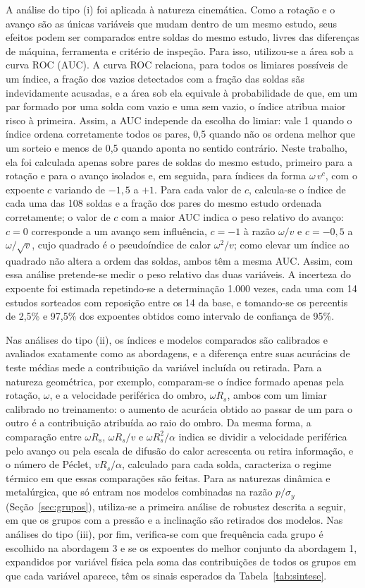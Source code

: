 \documentclass[12pt,openany]{report}
\begin{document}
A análise do tipo (i) foi aplicada à natureza cinemática. Como a rotação e o avanço são as únicas variáveis que mudam dentro de um mesmo estudo, seus efeitos podem ser comparados entre soldas do mesmo estudo, livres das diferenças de máquina, ferramenta e critério de inspeção. Para isso, utilizou-se a área sob a curva ROC (AUC). A curva ROC relaciona, para todos os limiares possíveis de um índice, a fração dos vazios detectados com a fração das soldas sãs indevidamente acusadas, e a área sob ela equivale à probabilidade de que, em um par formado por uma solda com vazio e uma sem vazio, o índice atribua maior risco à primeira. Assim, a AUC independe da escolha do limiar: vale 1 quando o índice ordena corretamente todos os pares, 0,5 quando não os ordena melhor que um sorteio e menos de 0,5 quando aponta no sentido contrário. Neste trabalho, ela foi calculada apenas sobre pares de soldas do mesmo estudo, primeiro para a rotação e para o avanço isolados e, em seguida, para índices da forma $\omega\,v^{c}$, com o expoente $c$ variando de $-1{,}5$ a $+1$. Para cada valor de $c$, calcula-se o índice de cada uma das 108 soldas e a fração dos pares do mesmo estudo ordenada corretamente; o valor de $c$ com a maior AUC indica o peso relativo do avanço: $c = 0$ corresponde a um avanço sem influência, $c = -1$ à razão $\omega/v$ e $c = -0{,}5$ a $\omega/\sqrt{v}$, cujo quadrado é o pseudoíndice de calor $\omega^{2}/v$; como elevar um índice ao quadrado não altera a ordem das soldas, ambos têm a mesma AUC. Assim, com essa análise pretende-se medir o peso relativo das duas variáveis. A incerteza do expoente foi estimada repetindo-se a determinação 1.000 vezes, cada uma com 14 estudos sorteados com reposição entre os 14 da base, e tomando-se os percentis de 2,5\% e 97,5\% dos expoentes obtidos como intervalo de confiança de 95\%.

Nas análises do tipo (ii), os índices e modelos comparados são calibrados e avaliados exatamente como as abordagens, e a diferença entre suas acurácias de teste médias mede a contribuição da variável incluída ou retirada. Para a natureza geométrica, por exemplo, comparam-se o índice formado apenas pela rotação, $\omega$, e a velocidade periférica do ombro, $\omega R_s$, ambos com um limiar calibrado no treinamento: o aumento de acurácia obtido ao passar de um para o outro é a contribuição atribuída ao raio do ombro. Da mesma forma, a comparação entre $\omega R_s$, $\omega R_s/v$ e $\omega R_{s}^{2}/\alpha$ indica se dividir a velocidade periférica pelo avanço ou pela escala de difusão do calor acrescenta ou retira informação, e o número de Péclet, $vR_s/\alpha$, calculado para cada solda, caracteriza o regime térmico em que essas comparações são feitas. Para as naturezas dinâmica e metalúrgica, que só entram nos modelos combinadas na razão $p/\sigma_y$ (Seção~\ref{sec:grupos}), utiliza-se a primeira análise de robustez descrita a seguir, em que os grupos com a pressão e a inclinação são retirados dos modelos. Nas análises do tipo (iii), por fim, verifica-se com que frequência cada grupo é escolhido na abordagem 3 e se os expoentes do melhor conjunto da abordagem 1, expandidos por variável física pela soma das contribuições de todos os grupos em que cada variável aparece, têm os sinais esperados da Tabela~\ref{tab:sintese}.
\end{document}

